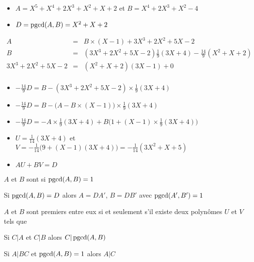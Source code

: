 \begin{frame}
\begin{exemple}
\begin{itemize}  
\setlength{\itemsep}{7pt} 
  \item $A=X^5+X^4+2X^3+X^2+X+2$ et $B=X^4+2X^3+X^2-4$
  \item $D= \mathop{\text{pgcd}}\nolimits(A,B)=X^2+X+2$
\end{itemize}
\pause
{\footnotesize
$$\begin{array}{rcl}
A & =  & B \times  (X\!-\!1)  + 3X^3+2X^2+5X-2\\
B &  =  & (3X^3+2X^2+5X-2) \frac19(3X+4) - \frac{14}{9}(X^2+X+2) \\
3X^3+2X^2+5X-2 &  =   & (X^2+X+2) (3X-1) + 0 \\
\end{array}$$
}
\pause
\begin{itemize}
\setlength{\itemsep}{7pt}
  \item $- \frac{14}{9} D = B - (3X^3+2X^2+5X-2)\times \frac19(3X+4)$
\pause
  \item $- \frac{14}{9} D = B - \big(A-B\times(X-1)\big)\times \frac19(3X+4)$
\pause
  \item $- \frac{14}{9}D = -A\times \frac19(3X+4) + B\big(1+(X-1)\times \frac19(3X+4)\big)$  
\pause
  \item {\small $U=\frac{1}{14}(3X+4)$  et  $V= -\frac{1}{14}\big(9+(X-1)(3X+4)\big)=-\frac{1}{14}(3X^2+X+5)$}
\pause
  \item $AU+BV=D$
\end{itemize}
\end{exemple}
\end{frame}


\begin{frame}

\begin{mydefinition}
$A$ et $ B$ sont  si  $\mathop{\text{pgcd}}\nolimits(A,B)=1$
\end{mydefinition}

\pause
\bigskip

Si  $\mathop{\text{pgcd}}\nolimits(A,B)=D$ alors $A=DA'$, $B=DB'$ avec $\mathop{\text{pgcd}}\nolimits(A',B')=1$

\end{frame}


\begin{frame}

\begin{corollaire}
$A$ et $B$ sont premiers entre eux si et seulement s'il existe deux polynômes $U$ et $V$ tels que 
\end{corollaire}

\pause

\begin{corollaire}
Si $C|A$ et $C|B$ alors $C|\mathop{\text{pgcd}}\nolimits(A,B)$
\end{corollaire}

\pause

\begin{corollaire}
Si $A|BC$ et $\mathop{\text{pgcd}}\nolimits(A,B)=1$ alors $A|C$
\end{corollaire}

\end{frame}


